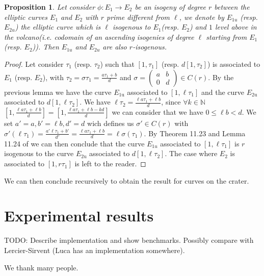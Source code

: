 \documentclass{lms}
\newcommand{\todo}[1]{{\color{red}TODO: #1}}
\newtheorem{prop}[thm]{Proposition}
\begin{document}
\begin{prop}
Let consider $\phi : E_1 \rightarrow E_2$ be an isogeny of degree $r$ between the elliptic curves $E_1$ and $E_2$ with $r$ prime different from $\ell$, we denote by $E_{1u}$ (resp. $E_{2u}$) the elliptic curve which is $\ell$ isogenous to $E_1$(resp. $E_2$) and $1$ level above in the volcano(i.e. codomain of an ascending isogenies of degree $\ell$ starting from $E_1$ (resp. $E_2$)). Then $E_{1u}$ and $E_{2u}$ are also $r$-isogenous.
\end{prop}

\begin{proof}
Let consider $\tau_1$ (resp. $\tau_2$)  such that $[1,\tau_1]$ (resp. $d[1,\tau_2]$) is associated to $E_1$ (resp. $E_2$), with $\tau_2=\sigma \tau_1 =\frac{a\tau_1+b}{d}$ and $\sigma =\left(\begin{array}{cc}
a & b\\
0 & d
\end{array}\right) \in C(r)$. 
\newline
By the previous lemma we have the curve $E_{1\mathrm{u}}$ associated to $[1,\ell \tau_1]$ and the curve $E_{2\mathrm{u}}$ associated to $d[1,\ell \tau_2]$.
\newline
We have $\ell \tau_2=\frac{\ell a\tau_1+\ell b}{d}$, since $\forall k \in \mathbb{N}$ $[1,\frac{\ell a\tau_1+\ell b}{d}]=[1,\frac{\ell a\tau_1+\ell b-kd}{d}]$ we can consider that we have $0 \leqslant \ell b<d$.
We set $a'=a, b'=\ell b, d'=d$ wich defines us $\sigma' \in C(r)$ with $\sigma'(\ell \tau_1)=\frac{a'\ell \tau_1+ b'}{d'}=\frac{\ell a\tau_1+\ell b}{d}=\ell \sigma(\tau_1)$. By Theorem 11.23 and Lemma 11.24 of \cite{Cox89} we can then conclude that the curve $E_{1u}$ associated to $[1,\ell \tau_1]$ is $r$ isogenous to the curve $E_{2\mathrm{u}}$ associated to $d[1,\ell \tau_2]$. The case where $E_2$ is associated to $[1,r\tau_1]$ is left to the reader. %
\end{proof}
 We can then conclude recursively to obtain the result for curves on the crater.





\section{Experimental results}
\label{sec:implem}

\todo{Describe implementation and show benchmarks. Possibly compare
  with Lercier-Sirvent (Luca has an implementation somewhere).}

\begin{acknowledgements}
  We thank many people.
\end{acknowledgements}



\end{document}
